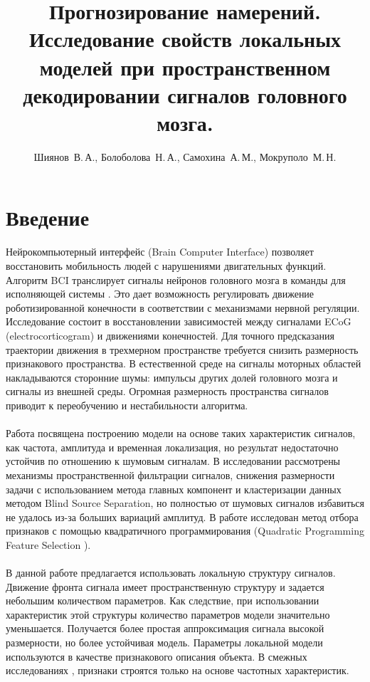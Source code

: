 \documentclass[12pt,twoside]{article}
\title
    [Прогнозирование намерений]
    {Прогнозирование намерений. Исследование свойств локальных моделей при пространственном декодировании сигналов головного мозга.}
\author
    [Болоболова~Н.\,А.]
    {Шиянов~В.\,А., Болоболова~Н.\,А., Самохина~А.\,М., Мокруполо~М.\,Н.}
\begin{document}
\maketitle
\bigskip
\bigskip
\bigskip
\bigskip
\bigskip
\maketitleSecondary

\section{Введение}
Нейрокомпьютерный интерфейс (Brain Computer Interface) \cite{Morishita2014} позволяет восстановить мобильность людей с нарушениями двигательных функций. Алгоритм BCI транслирует сигналы нейронов головного мозга в команды для исполняющей системы \cite{Morishita2014}. Это дает возможность регулировать движение роботизированной конечности в соответствии с механизмами нервной регуляции. Исследование состоит в восстановлении зависимостей между сигналами ECoG (electrocorticogram) и движениями конечностей. Для точного предсказания траектории движения в трехмерном пространстве требуется снизить размерность признакового пространства. В естественной среде на сигналы моторных областей накладываются сторонние шумы: импульсы других долей головного мозга и сигналы из внешней среды. Огромная размерность пространства сигналов приводит к переобучению и нестабильности алгоритма. \\\\
Работа \cite{Eliseyev2014} посвящена построению модели на основе таких характеристик сигналов, как частота, амплитуда и временная локализация, но результат недостаточно устойчив по отношению к шумовым сигналам. В исследовании \cite{Song2017} рассмотрены механизмы пространственной фильтрации сигналов, снижения размерности задачи с использованием метода главных компонент и кластеризации данных методом Blind Source Separation, но полностью от шумовых сигналов избавиться не удалось из-за больших вариаций амплитуд. В работе \cite{Motrenko_2018} исследован метод отбора признаков с помощью квадратичного программирования (Quadratic Programming Feature Selection \cite{rodriguez2010quadratic}). \\\\
В данной работе предлагается использовать локальную структуру сигналов. Движение фронта сигнала имеет пространственную структуру и задается небольшим количеством параметров. Как следствие, при использовании характеристик этой структуры количество параметров модели значительно уменьшается. Получается более простая аппроксимация сигнала высокой размерности, но более устойчивая модель. Параметры локальной модели используются в качестве признакового описания объекта. В смежных исследованиях \cite{Eliseyev2014}, \cite{Loza2017} признаки строятся только на основе частотных характеристик. \\\\
\end{document}
